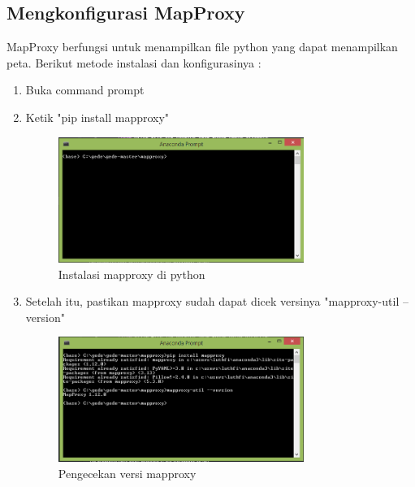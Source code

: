 \subsection{Mengkonfigurasi MapProxy}
MapProxy berfungsi untuk menampilkan file python yang dapat menampilkan peta. Berikut metode instalasi dan konfigurasinya :
\begin{enumerate}
    \item Buka command prompt
    \item Ketik "pip install mapproxy"
    \hfill\break
	\begin{figure}[H]
		\includegraphics[width=8cm]{figures/1174035/tugas4/mapproxy_1.png}
		\centering
		\caption{Instalasi mapproxy di python}
	\end{figure}
    \item Setelah itu, pastikan mapproxy sudah dapat dicek versinya "mapproxy-util --version"
    \hfill\break
	\begin{figure}[H]
		\includegraphics[width=8cm]{figures/1174035/tugas4/mapproxy_2.png}
		\centering
		\caption{Pengecekan versi mapproxy}
	\end{figure}

\end{enumerate}
